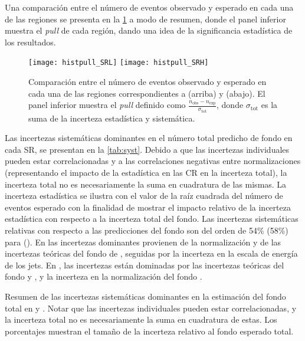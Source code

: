 Una comparación entre el número de eventos observado y esperado en cada una de las
regiones se presenta en la \cref{fig:fit_region_composition} a modo de resumen, donde
el panel inferior muestra el \emph{pull} de cada región, dando una idea de la significancia
estadística de los resultados.


\begin{figure}[!htbp]
  \centering

  \texttt{[image: histpull\_SRL]}
  \texttt{[image: histpull\_SRH]}

  \caption{Comparación entre el número de eventos observado y esperado en cada
    una de las regiones correspondientes a {\SRL} (arriba) y {\SRH} (abajo). El panel inferior
    muestra el \emph{pull} definido como $\frac{n_\text{obs} - n_\text{exp}}{\sigma_\text{tot}}$,
    donde $\sigma_\text{tot}$ es la suma de la incerteza estadística y sistemática.}

  \label{fig:fit_region_composition}

\end{figure}


Las incertezas sistemáticas dominantes en el número total predicho de fondo en
cada SR, se presentan en la \cref{tab:syst}.
Debido a que las incertezas individuales pueden estar correlacionadas y a las
correlaciones negativas entre normalizaciones (representando el impacto de la
estadística en las CR en la incerteza total), la incerteza total no es
necesariamente la suma en cuadratura de las mismas. La incerteza estadística se
ilustra con el valor de la raíz cuadrada del número de eventos esperado con la
finalidad de mostrar el impacto relativo de la incerteza estadística con
respecto a la incerteza total del fondo. Las incertezas sistemáticas relativas
con respecto a las predicciones del fondo son del orden de 54\% (58\%) para
{\SRL} (\SRH). En {\SRL} las incertezas dominantes provienen de la normalización
y de las incertezas teóricas del fondo de {\ttgam}, seguidas por la incerteza en
la escala de energía de los jets. En {\SRH}, las
incertezas están dominadas por las incertezas teóricas del fondo {\zgam} y
{\gjet}, y la incerteza en la normalización del fondo {\wgam}.


\begin{table}[!htb]
  \centering

  \caption{Resumen de las incertezas sistemáticas dominantes en la estimación del fondo total
    en {\SRL} y {\SRH}. Notar que las incertezas individuales pueden estar correlacionadas, y la incerteza
    total no es necesariamente la suma en cuadratura de estas. Los porcentajes muestran el tamaño
    de la incerteza relativo al fondo esperado total.}
  \label{tab:syst}

  
\end{table}



